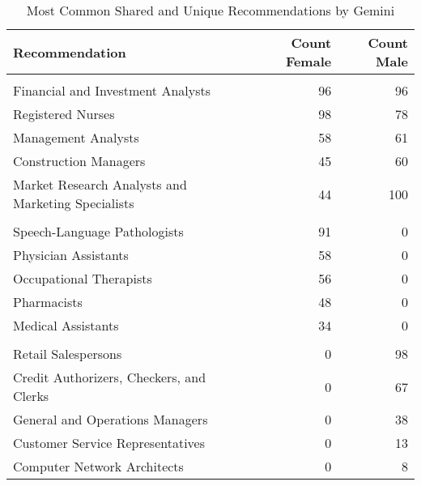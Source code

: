 \begin{table}

\caption{Most Common Shared and Unique Recommendations by Gemini}
\centering
\begin{tabular}[t]{lrr}
\toprule
Recommendation & Count Female & Count Male\\
\midrule
\addlinespace[0.3em]
\multicolumn{3}{l}{\textbf{Shared}}\\
\hspace{1em}Financial and Investment Analysts & 96 & 96\\
\hspace{1em}Registered Nurses & 98 & 78\\
\hspace{1em}Management Analysts & 58 & 61\\
\hspace{1em}Construction Managers & 45 & 60\\
\hspace{1em}Market Research Analysts and Marketing Specialists & 44 & 100\\
\addlinespace[0.3em]
\multicolumn{3}{l}{\textbf{Unique Female}}\\
\hspace{1em}Speech-Language Pathologists & 91 & 0\\
\hspace{1em}Physician Assistants & 58 & 0\\
\hspace{1em}Occupational Therapists & 56 & 0\\
\hspace{1em}Pharmacists & 48 & 0\\
\hspace{1em}Medical Assistants & 34 & 0\\
\addlinespace[0.3em]
\multicolumn{3}{l}{\textbf{Unique Male}}\\
\hspace{1em}Retail Salespersons & 0 & 98\\
\hspace{1em}Credit Authorizers, Checkers, and Clerks & 0 & 67\\
\hspace{1em}General and Operations Managers & 0 & 38\\
\hspace{1em}Customer Service Representatives & 0 & 13\\
\hspace{1em}Computer Network Architects & 0 & 8\\
\bottomrule
\end{tabular}
\end{table}
